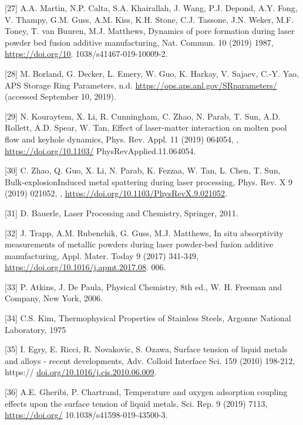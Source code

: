 \documentclass[10pt]{article}
\begin{document}
[27] A.A. Martin, N.P. Calta, S.A. Khairallah, J. Wang, P.J. Depond, A.Y. Fong, V. Thampy, G.M. Guss, A.M. Kiss, K.H. Stone, C.J. Tassone, J.N. Weker, M.F. Toney, T. van Buuren, M.J. Matthews, Dynamics of pore formation during laser powder bed fusion additive manufacturing, Nat. Commun. 10 (2019) 1987, \href{https://doi.org/10}{https://doi.org/10}. 1038/s41467-019-10009-2.

[28] M. Borland, G. Decker, L. Emery, W. Guo, K. Harkay, V. Sajaev, C.-Y. Yao, APS Storage Ring Parameters, n.d. \href{https://ops.aps.anl.gov/SRparameters/}{https://ops.aps.anl.gov/SRparameters/} (accessed September 10, 2019).

[29] N. Kouraytem, X. Li, R. Cunningham, C. Zhao, N. Parab, T. Sun, A.D. Rollett, A.D. Spear, W. Tan, Effect of laser-matter interaction on molten pool flow and keyhole dynamics, Phys. Rev. Appl. 11 (2019) 064054, , \href{https://doi.org/10.1103/}{https://doi.org/10.1103/} PhysRevApplied.11.064054.

[30] C. Zhao, Q. Guo, X. Li, N. Parab, K. Fezzaa, W. Tan, L. Chen, T. Sun, Bulk-explosionInduced metal spattering during laser processing, Phys. Rev. X 9 (2019) 021052, , \href{https://doi.org/10.1103/PhysRevX.9.021052}{https://doi.org/10.1103/PhysRevX.9.021052}.

[31] D. Bauerle, Laser Processing and Chemistry, Springer, 2011.

[32] J. Trapp, A.M. Rubenchik, G. Guss, M.J. Matthews, In situ absorptivity measurements of metallic powders during laser powder-bed fusion additive manufacturing, Appl. Mater. Today 9 (2017) 341-349, \href{https://doi.org/10.1016/j.apmt.2017.08}{https://doi.org/10.1016/j.apmt.2017.08}. 006.

[33] P. Atkins, J. De Paula, Physical Chemistry, 8th ed., W. H. Freeman and Company, New York, 2006.

[34] C.S. Kim, Thermophysical Properties of Stainless Steels, Argonne National Laboratory, 1975

[35] I. Egry, E. Ricci, R. Novakovic, S. Ozawa, Surface tension of liquid metals and alloys - recent developments, Adv. Colloid Interface Sci. 159 (2010) 198-212, https:// \href{http://doi.org/10.1016/j.cis.2010.06.009}{doi.org/10.1016/j.cis.2010.06.009}.

[36] A.E. Gheribi, P. Chartrand, Temperature and oxygen adsorption coupling effects upon the surface tension of liquid metals, Sci. Rep. 9 (2019) 7113, \href{https://doi.org/}{https://doi.org/} 10.1038/s41598-019-43500-3.
\end{document}
